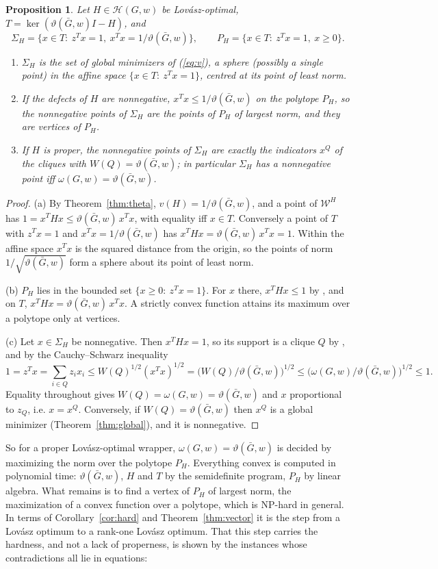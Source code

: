 \documentclass[11pt]{article}
\newtheorem{prop}[thm]{Proposition}
\theoremstyle{definition}
\theoremstyle{remark}
\newcommand{\Hc}{\mathcal{H}}
\newcommand{\Wc}{\mathcal{W}}
\newcommand{\vt}{\vartheta(\bar G,w)}
\newcommand{\om}{\omega(G,w)}
\begin{document}
\begin{prop}
\label{prop:proper}
Let $H\in\Hc(G,w)$ be Lov\'asz-optimal, $T=\ker(\vt I-H)$, and
\[ \Sigma_H=\{x\in T:\ z^Tx=1,\ x^Tx=1/\vt\}, \qquad
   P_H=\{x\in T:\ z^Tx=1,\ x\geq0\}. \]
\begin{enumerate}
\item[(a)] $\Sigma_H$ is the set of global minimizers of (\ref{eq:v}), a
sphere (possibly a single point) in the affine space
$\{x\in T:\ z^Tx=1\}$, centred at its point of least norm.
\item[(b)] If the defects of $H$ are nonnegative, $x^Tx\leq1/\vt$ on the
polytope $P_H$, so the nonnegative points of $\Sigma_H$ are the points of
$P_H$ of largest norm, and they are vertices of $P_H$.
\item[(c)] If $H$ is proper, the nonnegative points of $\Sigma_H$ are exactly
the indicators $x^Q$ of the cliques with $W(Q)=\vt$; in particular
$\Sigma_H$ has a nonnegative point iff $\om=\vt$.
\end{enumerate}
\end{prop}
\begin{proof}
(a) By Theorem~\ref{thm:theta}, $v(H)=1/\vt$, and a point of $\Wc^H$ has
$1=x^THx\leq\vt\,x^Tx$, with equality iff $x\in T$. Conversely a point of
$T$ with $z^Tx=1$ and $x^Tx=1/\vt$ has $x^THx=\vt\,x^Tx=1$. Within the
affine space $x^Tx$ is the squared distance from the origin, so the points
of norm $1/\sqrt{\vt}$ form a sphere about its point of least norm.

(b) $P_H$ lies in the bounded set $\{x\geq0:\ z^Tx=1\}$. For $x$ there,
$x^THx\leq1$ by \cite[Proposition~1]{CW}, and on $T$, $x^THx=\vt\,x^Tx$.
A strictly convex function attains its maximum over a polytope only at
vertices.

(c) Let $x\in\Sigma_H$ be nonnegative. Then $x^THx=1$, so its support is a
clique $Q$ by \cite[Proposition~2]{CW}, and by the Cauchy--Schwarz
inequality
\[ 1=z^Tx=\sum_{i\in Q}z_ix_i\leq W(Q)^{1/2}(x^Tx)^{1/2}
   =\bigl(W(Q)/\vt\bigr)^{1/2}\leq\bigl(\om/\vt\bigr)^{1/2}\leq1. \]
Equality throughout gives $W(Q)=\om=\vt$ and $x$ proportional to $z_Q$,
i.e. $x=x^Q$. Conversely, if $W(Q)=\vt$ then $x^Q$ is a global minimizer
(Theorem~\ref{thm:global}), and it is nonnegative.
\end{proof}

So for a proper Lov\'asz-optimal wrapper, $\om=\vt$ is decided by
maximizing the norm over the polytope $P_H$. Everything convex is computed
in polynomial time: $\vt$, $H$ and $T$ by the semidefinite program, $P_H$ by
linear algebra. What remains is to find a vertex of $P_H$ of largest norm,
the maximization of a convex function over a polytope, which is NP-hard in
general. In terms of Corollary~\ref{cor:hard} and Theorem~\ref{thm:vector}
it is the step from a Lov\'asz optimum to a rank-one Lov\'asz optimum. That
this step carries the hardness, and not a lack of properness, is shown by
the instances whose contradictions all lie in equations:
\end{document}
